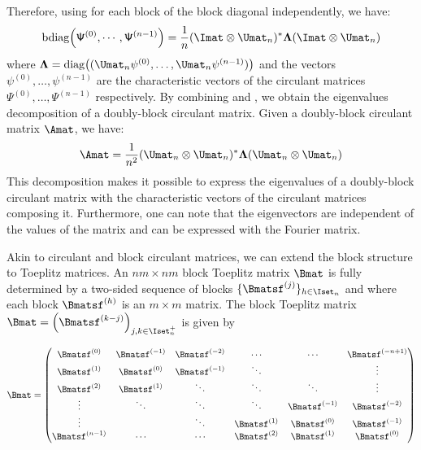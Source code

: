 Therefore, using  for each block of the block diagonal independently, we have:
\begin{equation} \label{equation:ch2-diagonalization_circulant_with_bdiag}
  \bdiag\leftmat \mathsf{\Psi}^{(0)}, \cdots, \mathsf{\Psi}^{(n-1)} \rightmat = \frac{1}{n} (\Imat \otimes \Umat_n)^* \boldsymbol{\Lambda} (\Imat \otimes \Umat_n)
\end{equation}
where $\boldsymbol{\Lambda} = \diag\left((\Umat_n \mathsf{\psi}^{(0)}, \dots, \Umat_n \mathsf{\psi}^{(n-1)})\right)$ and the vectors $\mathsf{\psi}^{(0)}, \dots, \mathsf{\psi}^{(n-1)}$ are the characteristic vectors of the circulant matrices $\mathsf{\Psi}^{(0)}, \dots, \mathsf{\Psi}^{(n-1)}$ respectively.
By combining  and , we obtain the eigenvalues decomposition of a doubly-block circulant matrix.
Given a doubly-block circulant matrix $\Amat$, we have:
\begin{equation} \label{equation:ch2-diagonalization_doubly_block_circulant_matrix}
  \Amat = \frac{1}{n^2} (\Umat_n \otimes \Umat_n)^* \boldsymbol{\Lambda} (\Umat_n \otimes \Umat_n) 
\end{equation}
This decomposition makes it possible to express the eigenvalues of a doubly-block circulant matrix with the characteristic vectors of the circulant matrices composing it.
Furthermore, one can note that the eigenvectors are independent of the values of the matrix and can be expressed with the Fourier matrix.


Akin to circulant and block circulant matrices, we can extend the block structure to Toeplitz matrices.
An $nm \times nm$ block Toeplitz matrix $\Bmat$ is fully determined by a two-sided sequence of blocks $\{\Bmatsf^{(j)}\}_{h \in \Iset_n}$ and where each block $\Bmatsf^{(h)}$ is an $m \times m$ matrix.
The block Toeplitz matrix $\Bmat = \leftmat\Bmatsf^{(k-j)} \rightmat_{j,k \in \Iset^+_n}$ is given by

\begin{equation} \label{equation:ch2-block_toeplitz_matrices}
  \Bmat = 
  \leftmatrix
    \Bmatsf^{(0)}   & \Bmatsf^{(-1)} & \Bmatsf^{(-2)} & \cdots         & \cdots         & \Bmatsf^{(-n+1)} \\
    \Bmatsf^{(1)}   & \Bmatsf^{(0)}  & \Bmatsf^{(-1)} & \ddots         &                & \vdots           \\
    \Bmatsf^{(2)}   & \Bmatsf^{(1)}  & \ddots         & \ddots         & \ddots         & \vdots           \\ 
    \vdots          & \ddots         & \ddots         & \ddots         & \Bmatsf^{(-1)} & \Bmatsf^{(-2)}   \\
    \vdots          &                & \ddots         & \Bmatsf^{(1)} & \Bmatsf^{(0)}   & \Bmatsf^{(-1)}   \\
    \Bmatsf^{(n-1)} & \cdots         & \cdots         & \Bmatsf^{(2)} & \Bmatsf^{(1)}   & \Bmatsf^{(0)}
  \rightmatrix
\end{equation}

